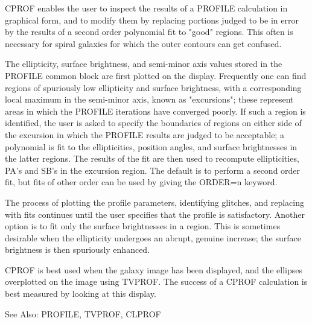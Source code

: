 CPROF enables the user to inspect the results of a PROFILE calculation in
graphical form, and to modify them by replacing portions judged to be in
error by the results of a second order polynomial fit to "good" regions.
This often is necessary for spiral galaxies for which the outer contours
can get confused.

The ellipticity, surface brightness, and semi-minor axis values stored in
the PROFILE common block are first plotted on the display.  Frequently one
can find regions of spuriously low ellipticity and surface brightness, with
a corresponding local maximum in the semi-minor axis, known as "excursions";
these represent areas in which the PROFILE iterations have converged
poorly. If such a region is identified, the user is asked to specify the
boundaries of regions on either side of the excursion in which the PROFILE
results are judged to be acceptable; a polynomial is fit to the
ellipticities, position angles, and surface brightnesses in the latter
regions. The results of the fit are then used to recompute ellipticities,
PA's and SB's in the excursion region. The default is to perform a second
order fit, but fits of other order can be used by giving the ORDER=n
keyword.

The process of plotting the profile parameters, identifying glitches, and
replacing with fits continues until the user specifies that the profile is
satisfactory. Another option is to fit only the surface brightnesses in a
region. This is sometimes desirable when the ellipticity undergoes an
abrupt, genuine increase; the surface brightness is then spuriously
enhanced.

CPROF is best used when the galaxy image has been displayed, and the
ellipses overplotted on the image using TVPROF. The success of a CPROF
calculation is best measured by looking at this display.

See Also: PROFILE, TVPROF, CLPROF


